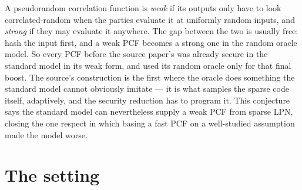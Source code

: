 \documentclass{aicr-conjecture}
\begin{document}

\vspace{0.4em}

\begin{informalconjecture}
A pseudorandom correlation function is \emph{weak} if its outputs only
have to look correlated-random when the parties evaluate it at uniformly
random inputs, and \emph{strong} if they may evaluate it anywhere. The
gap between the two is usually free: hash the input first, and a weak
PCF becomes a strong one in the random oracle model. So every PCF before
the source paper's was already secure in the standard model in its weak
form, and used its random oracle only for that final boost. The source's
construction is the first where the oracle does something the standard
model cannot obviously imitate --- it is what samples the sparse code
itself, adaptively, and the security reduction has to program it. This
conjecture says the standard model can nevertheless supply a weak PCF
from sparse LPN, closing the one respect in which basing a fast PCF on a
well-studied assumption made the model worse.
\end{informalconjecture}

\section{The setting}\label{sec:setting}
\end{document}
